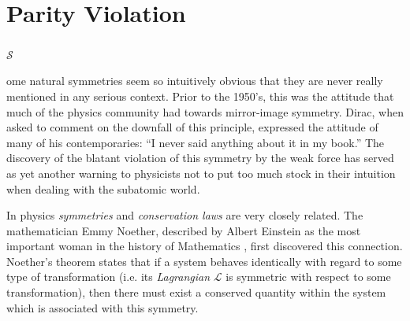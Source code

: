 \documentclass[a4paper,12pt]{book}
\begin{document}
\chapter{Parity Violation}

\paragraph{}\begin{Large}$\mathcal{S}$\end{Large}ome natural symmetries seem so intuitively obvious that they are never really mentioned in any serious context. Prior to the 1950's, this was the attitude that much of the physics community had towards mirror-image symmetry. Dirac, when asked to comment on the downfall of this principle, expressed the attitude of many of his contemporaries\cite{polkinghorne}: ``I never said anything about it in my book.'' The discovery of the blatant violation of this symmetry by the weak force has served as yet another warning to physicists not to put too much stock in their intuition when dealing with the subatomic world. 

In physics \emph{symmetries} and \emph{conservation laws} are very closely related. The mathematician Emmy Noether, described by Albert Einstein as the most important woman in the history of Mathematics \cite{einstein}, first discovered this connection. Noether's theorem states that if a system behaves identically with regard to some type of transformation (i.e. its \emph{Lagrangian} $\mathcal{L}$ is symmetric with respect to some transformation), then there must exist a conserved quantity within the system which is associated with this symmetry.
\end{document}
